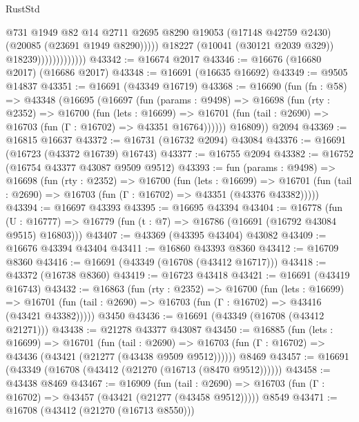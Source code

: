 \begin{lexlean}{RustStd}
\begin{coremodule}
                                    @731
                                    @1949
                                    @82
                                    @14
                                    @2711
                                    @2695
                                    @8290
                                    @19053
                                    (@17148 @42759 @2430)
                                    (@20085 (@23691 @1949 @8290)))))
                              @18227
                              (@10041 (@30121 @2039 @329))
                              @18239)))))))))))))
@43342 := @16674 @2017
@43346 := @16676 (@16680 @2017) (@16686 @2017)
@43348 := @16691 (@16635 @16692)
@43349 := @9505 @14837
@43351 := @16691 (@43349 @16719)
@43368 := @16690
    (fun (fn : @58) =>
    @43348
      (@16695
        (@16697
          (fun (params : @9498) =>
          @16698
            (fun (rty : @2352) =>
            @16700
              (fun (lets : @16699) =>
              @16701 (fun (tail : @2690) => @16703 (fun (Γ : @16702) => @43351 @16764))))))
        @16809))
    @2094
@43369 := @16815 @16637
@43372 := @16731 (@16732 @2094) @43084
@43376 := @16691 (@16723 (@43372 @16739) @16743)
@43377 := @16755 @2094
@43382 := @16752 (@16754 @43377 @43087 @9509 @9512)
@43393 := fun (params : @9498) =>
  @16698
    (fun (rty : @2352) =>
    @16700
      (fun (lets : @16699) =>
      @16701 (fun (tail : @2690) => @16703 (fun (Γ : @16702) => @43351 (@43376 @43382)))))
@43394 := @16697 @43393
@43395 := @16695 @43394
@43404 := @16778
    (fun (U : @16777) => @16779 (fun (t : @7) => @16786 (@16691 (@16792 @43084 @9515) @16803)))
@43407 := @43369 (@43395 @43404) @43082
@43409 := @16676 @43394 @43404
@43411 := @16860 @43393 @8360
@43412 := @16709 @8360
@43416 := @16691 (@43349 (@16708 (@43412 @16717)))
@43418 := @43372 (@16738 @8360)
@43419 := @16723 @43418
@43421 := @16691 (@43419 @16743)
@43432 := @16863
    (fun (rty : @2352) =>
    @16700
      (fun (lets : @16699) =>
      @16701 (fun (tail : @2690) => @16703 (fun (Γ : @16702) => @43416 (@43421 @43382)))))
    @3450
@43436 := @16691 (@43349 (@16708 (@43412 @21271)))
@43438 := @21278 @43377 @43087
@43450 := @16885
    (fun (lets : @16699) =>
    @16701
      (fun (tail : @2690) =>
      @16703 (fun (Γ : @16702) => @43436 (@43421 (@21277 (@43438 @9509 @9512))))))
    @8469
@43457 := @16691 (@43349 (@16708 (@43412 (@21270 (@16713 (@8470 @9512))))))
@43458 := @43438 @8469
@43467 := @16909
    (fun (tail : @2690) => @16703 (fun (Γ : @16702) => @43457 (@43421 (@21277 (@43458 @9512)))))
    @8549
@43471 := @16708 (@43412 (@21270 (@16713 @8550)))

\end{coremodule}
\end{lexlean}

